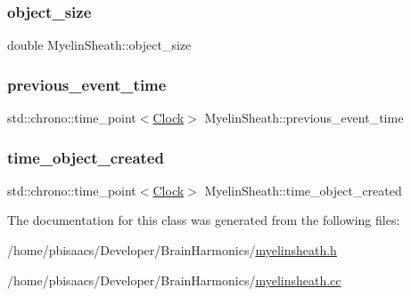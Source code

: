 \subsubsection{\texorpdfstring{object\+\_\+size}{object\_size}}
{\footnotesize\ttfamily double Myelin\+Sheath\+::object\+\_\+size\hspace{0.3cm}{\ttfamily [private]}}

\mbox{\label{classMyelinSheath_a93336530fb4a6210f7bd3ec297192042}} 
\subsubsection{\texorpdfstring{previous\+\_\+event\+\_\+time}{previous\_event\_time}}
{\footnotesize\ttfamily std\+::chrono\+::time\+\_\+point$<$\mbox{\hyperlink{universe_8h_a0ef8d951d1ca5ab3cfaf7ab4c7a6fd80}{Clock}}$>$ Myelin\+Sheath\+::previous\+\_\+event\+\_\+time\hspace{0.3cm}{\ttfamily [private]}}

\mbox{\label{classMyelinSheath_a5ff52b5d66d81809d62851ce6b8b12a8}} 
\subsubsection{\texorpdfstring{time\+\_\+object\+\_\+created}{time\_object\_created}}
{\footnotesize\ttfamily std\+::chrono\+::time\+\_\+point$<$\mbox{\hyperlink{universe_8h_a0ef8d951d1ca5ab3cfaf7ab4c7a6fd80}{Clock}}$>$ Myelin\+Sheath\+::time\+\_\+object\+\_\+created\hspace{0.3cm}{\ttfamily [private]}}



The documentation for this class was generated from the following files\+:\begin{DoxyCompactItemize}
\item 
/home/pbisaacs/\+Developer/\+Brain\+Harmonics/\mbox{\hyperlink{myelinsheath_8h}{myelinsheath.\+h}}\item 
/home/pbisaacs/\+Developer/\+Brain\+Harmonics/\mbox{\hyperlink{myelinsheath_8cc}{myelinsheath.\+cc}}\end{DoxyCompactItemize}
